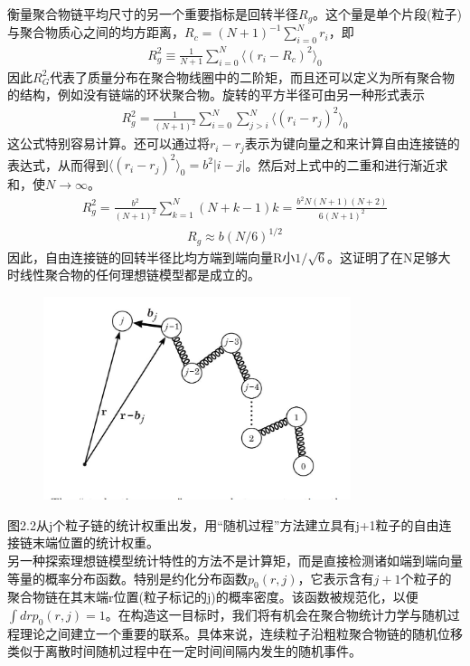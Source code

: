 衡量聚合物链平均尺寸的另一个重要指标是回转半径$R_{g}$。这个量是单个片段(粒子)与聚合物质心之间的均方距离，$R_{c}=(N+1)^{-1} \sum _{i=0}^{N} r_{i}$，即\\
\begin{gather}
R_{g}^2 \equiv \frac{1}{N+1} \sum _{i=0}^{N} \langle (r_{i}- R_{c})^2 \rangle_{0} 
\end{gather}
因此$R_{G}^2$代表了质量分布在聚合物线圈中的二阶矩，而且还可以定义为所有聚合物的结构，例如没有链端的环状聚合物。旋转的平方半径可由另一种形式表示\\
\begin{gather}
R_{g}^2=\frac{1}{(N+1)^2} \sum _{i=0}^{N} \sum _{j>i}^{N} \langle (r_{i}- r_{j})^2 \rangle_{0} 
\end{gather}
这公式特别容易计算。还可以通过将$r_{i}-r_{j}$表示为键向量之和来计算自由连接链的表达式，从而得到$\langle (r_{i}- r_{j})^2 \rangle_{0}=b^2 |i-j|$。然后对上式中的二重和进行渐近求和，使$N \rightarrow \infty $。\\
\begin{gather}
R_{g}^{2} = \frac{b^2}{(N+1)^2} \sum _{k=1} ^{N} (N+k-1)k=\frac{b^2 N(N+1)(N+2)}{6(N+1)^2}
\end{gather}
\begin{gather}
R_{g}\approx b(N/6)^{1/2}
\end{gather}
因此，自由连接链的回转半径比均方端到端向量R小$1/\sqrt{6}$。这证明了在N足够大时线性聚合物的任何理想链模型都是成立的。\\
\begin{figure}
				\caption{ }
				\centering
				\includegraphics[width=9cm]{./figures/3.png}
			\end{figure}
图2.2从j个粒子链的统计权重出发，用“随机过程”方法建立具有j+1粒子的自由连接链末端位置的统计权重。\\

另一种探索理想链模型统计特性的方法不是计算矩，而是直接检测诸如端到端向量等量的概率分布函数。特别是约化分布函数$p_{0}(r,j)$，它表示含有$j+1$个粒子的聚合物链在其末端r位置(粒子标记的j)的概率密度。该函数被规范化，以便$\int drp_0(r,j)=1$。在构造这一目标时，我们将有机会在聚合物统计力学与随机过程理论之间建立一个重要的联系。具体来说，连续粒子沿粗粒聚合物链的随机位移类似于离散时间随机过程中在一定时间间隔内发生的随机事件。\\

